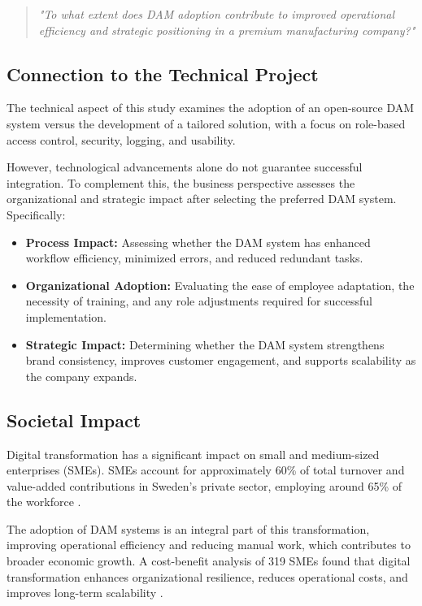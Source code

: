 \documentclass[a4paper,12pt,twocolumn]{article}
\begin{document}
\begin{quote}
    \textit{"To what extent does DAM adoption contribute to improved operational efficiency and strategic positioning in a premium manufacturing company?"}
\end{quote}

\subsection{Connection to the Technical Project}
The technical aspect of this study examines the adoption of an open-source DAM system versus 
the development of a tailored solution, with a focus on role-based access control, security, 
logging, and usability. 

\vspace{0.3cm} 
However, technological advancements alone do not guarantee successful integration. To complement this,
the business perspective assesses the organizational and strategic impact after selecting the preferred DAM system. Specifically:
\begin{itemize}
    \item \textbf{Process Impact:} Assessing whether the DAM system has enhanced workflow efficiency, minimized errors, and reduced redundant tasks.
    \item \textbf{Organizational Adoption:} Evaluating the ease of employee adaptation, the necessity of training, and any role adjustments required for successful implementation.
    \item \textbf{Strategic Impact:} Determining whether the DAM system strengthens brand consistency, improves customer engagement, and supports scalability as the company expands.
\end{itemize}

\vspace{0.3cm} 
\subsection{Societal Impact}
Digital transformation has a significant impact on small and medium-sized enterprises (SMEs). SMEs account for approximately 
60\% of total turnover and value-added contributions in Sweden’s private sector, employing around 65\% of the workforce \citep{tillvaxtverket2021}.

\vspace{0.3cm}
The adoption of DAM systems is an integral part of this transformation, 
improving operational efficiency and reducing manual work,
which contributes to broader economic growth. A cost-benefit analysis of 319 SMEs 
found that digital transformation enhances organizational resilience, reduces 
operational costs, and improves long-term scalability \citep{teng2022}.
\end{document}
